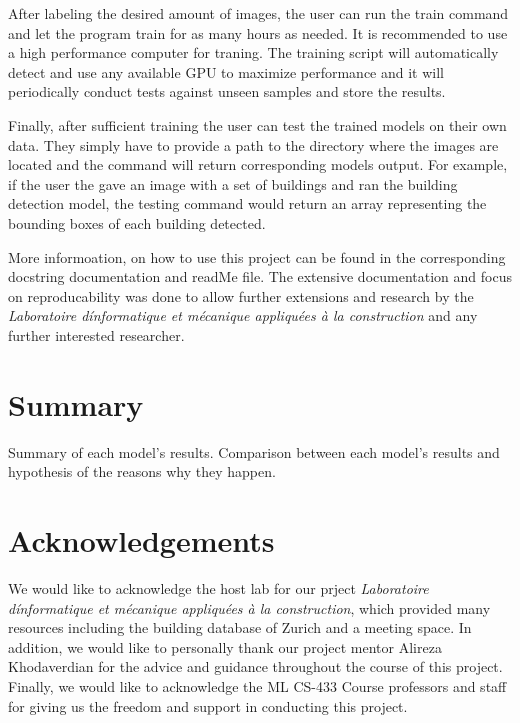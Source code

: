 \documentclass[10pt,conference,compsocconf]{IEEEtran}
\begin{document}
After labeling the desired amount of images, the user can run the train command and let the program train for as many hours as needed. It is recommended to use a high performance computer for traning. The training script will automatically detect and use any available GPU to maximize performance and it will periodically conduct tests against unseen samples and store the results. 

Finally, after sufficient training the user can test the trained models on their own data. They simply have to provide a path to the directory where the images are located and the command will return corresponding models output. For example, if the user the gave an image with a set of buildings and ran the building detection model, the testing command would return an array representing the bounding boxes of each building detected.

More informoation, on how to use this project can be found in the corresponding docstring documentation and readMe file. The extensive documentation and focus on reproducability was done to allow further extensions and research by the  \textit{Laboratoire dínformatique et mécanique appliquées à la construction} and any further interested researcher.

\section{Summary}
Summary of each model's results. Comparison between each model's results and hypothesis of the reasons why they happen. 

\section*{Acknowledgements}
We would like to acknowledge the host lab for our prject \textit{Laboratoire dínformatique et mécanique appliquées à la construction}, which provided many resources including the building database of Zurich and a meeting space. In addition, we would like to personally thank our project mentor Alireza Khodaverdian for the advice and guidance throughout the course of this project. Finally, we would like to acknowledge the ML CS-433 Course professors and staff for giving us the freedom and support in conducting this project.



\end{document}
